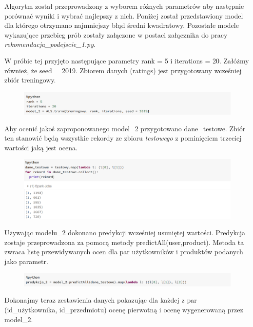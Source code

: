 \documentclass[12pt,a4paper]{report}
\begin{document}
Algorytm został przeprowadzony z wyborem różnych parametrów aby następnie porównać wyniki i wybrać najlepszy z nich.
Poniżej został przedstawiony model dla którego otrzymano najmniejszy błąd średni kwadratowy.
Pozostałe modele wykazujące przebieg prób zostały załączone w postaci załącznika do pracy \textit{rekomendacja\_podejscie\_1.py}. 

W próbie tej przyjęto następujące parametry rank = 5 i iterations = 20. Załóżmy również, że seed = 2019. Zbiorem danych (ratings) jest przygotowany wcześniej zbiór treningowy.

\begin{figure}[H]
\includegraphics[scale=0.5]{obrazy/ALS8.PNG} 
\end{figure}

Aby ocenić jakoś zaproponowanego model\_2 przygotowano dane\_testowe. Zbiór ten stanowić będą wszystkie rekordy ze zbioru \textit{testowego} z pominięciem trzeciej wartości jaką jest ocena.

\begin{figure}[H]
\includegraphics[scale=0.5]{obrazy/ALS9.PNG} 
\end{figure}

Używając modelu\_2 dokonano predykcji wcześniej usuniętej wartości.
Predykcja zostaje przeprowadzona za pomocą metody  predictAll(user,product). Metoda ta zwraca listę przewidywanych ocen dla par użytkowników i produktów podanych jako parametr.

\begin{figure}[H]
\includegraphics[scale=0.5]{obrazy/ALS10.PNG} 
\end{figure}

Dokonajmy teraz zestawienia danych pokazując dla każdej z par (id\_użytkownika, id\_przedmiotu) ocenę pierwotną i ocenę wygenerowaną przez model\_2.
\end{document}
